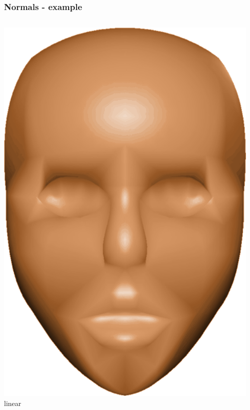 \begin{frame}\frametitle{Normals - example}
	\begin{columns}
		\begin{column}{0.4\textwidth}
		\begin{center}
				\includegraphics[width=\textwidth]{img/1_single/linearlyVaryingNormals.png}
				\small{linear}
			\end{center}	
		\end{column}
		\begin{column}{0.4\textwidth}
		\begin{center}

\end{center}
\end{column}
\end{columns}
\end{frame}
